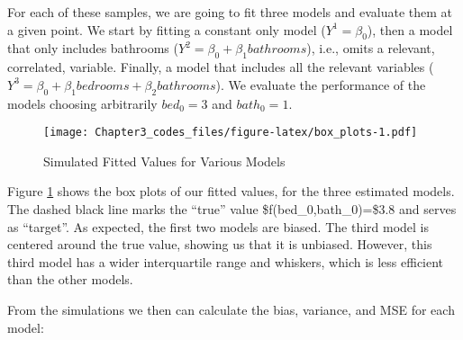 \noindent  For each of these samples, we are going to fit three models and evaluate them at a given point. We start by fitting a constant only model ($Y^1 =\beta_0$), then a model that only includes bathrooms ($Y^2=\beta_0 + \beta_1 bathrooms$), i.e.,
omits a relevant, correlated, variable. Finally, a model that includes all
the relevant variables ($Y^3=\beta_0 + \beta_1 bedrooms + \beta_2 bathrooms$). We evaluate the performance of the models choosing arbitrarily \(bed_0=3\) and \(bath_0 =1\). 

\begin{Shaded}
\end{Shaded}

\begin{figure}[H]
    \centering
    \caption{Simulated Fitted Values for Various Models}
    \texttt{[image: Chapter3\_codes\_files/figure-latex/box\_plots-1.pdf]}
    \label{fig:simulation}
\end{figure}


\noindent Figure \ref{fig:simulation} shows the box plots of our fitted values,
for the three estimated models. The dashed black line marks the ``true''
value \$f(bed\_0,bath\_0)=\$3.8 and serves as ``target''. As expected, the first two models are biased. The third model is centered around the true value, showing us that it is unbiased. However, this third model has a wider interquartile range and whiskers, which is
less efficient than the other models.

From the simulations we then can calculate the bias, variance, and MSE for each
model:

